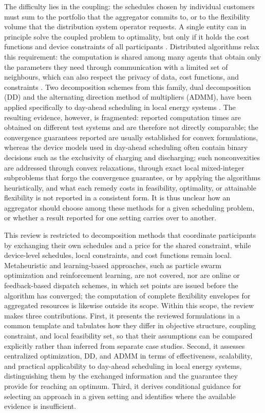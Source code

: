 \documentclass[conference]{IEEEtran}
\begin{document}
The difficulty lies in the coupling: the schedules chosen by individual customers must sum to the portfolio that the aggregator commits to, or to the flexibility volume that the distribution system operator requests. A single entity can in principle solve the coupled problem to optimality, but only if it holds the cost functions and device constraints of all participants \cite{Diekerhof2018}. Distributed algorithms relax this requirement: the computation is shared among many agents that obtain only the parameters they need through communication with a limited set of neighbours, which can also respect the privacy of data, cost functions, and constraints \cite{Molzahn2017}. Two decomposition schemes from this family, dual decomposition (DD) and the alternating direction method of multipliers (ADMM), have been applied specifically to day-ahead scheduling in local energy systems \cite{Diekerhof2018,OlivellaRosell2020}. The resulting evidence, however, is fragmented: reported computation times are obtained on different test systems and are therefore not directly comparable; the convergence guarantees reported are usually established for convex formulations, whereas the device models used in day-ahead scheduling often contain binary decisions such as the exclusivity of charging and discharging; such nonconvexities are addressed through convex relaxations, through exact local mixed-integer subproblems that forgo the convergence guarantee, or by applying the algorithms heuristically, and what each remedy costs in feasibility, optimality, or attainable flexibility is not reported in a consistent form. It is thus unclear how an aggregator should choose among these methods for a given scheduling problem, or whether a result reported for one setting carries over to another.

This review is restricted to decomposition methods that coordinate participants by exchanging their own schedules and a price for the shared constraint, while device-level schedules, local constraints, and cost functions remain local. Metaheuristic and learning-based approaches, such as particle swarm optimization and reinforcement learning, are not covered, nor are online or feedback-based dispatch schemes, in which set points are issued before the algorithm has converged; the computation of complete flexibility envelopes for aggregated resources is likewise outside its scope. Within this scope, the review makes three contributions. First, it presents the reviewed formulations in a common template and tabulates how they differ in objective structure, coupling constraint, and local feasibility set, so that their assumptions can be compared explicitly rather than inferred from separate case studies. Second, it assesses centralized optimization, DD, and ADMM in terms of effectiveness, scalability, and practical applicability to day-ahead scheduling in local energy systems, distinguishing them by the exchanged information and the guarantee they provide for reaching an optimum. Third, it derives conditional guidance for selecting an approach in a given setting and identifies where the available evidence is insufficient.
\end{document}
